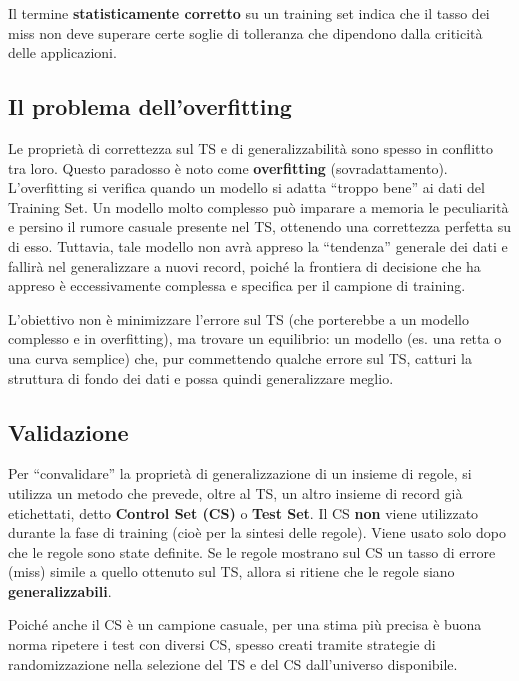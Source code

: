 \begin{nota}{}{}
Il termine \textbf{statisticamente corretto} su un training set indica che il
tasso dei miss non deve superare certe soglie di tolleranza che dipendono
dalla criticità delle applicazioni.
\end{nota}

\subsection{Il problema dell'overfitting}

Le proprietà di correttezza sul TS e di generalizzabilità sono
spesso in conflitto tra loro.
Questo paradosso è noto come \textbf{overfitting} (sovradattamento).
L'overfitting si verifica quando un modello si adatta
``troppo bene'' ai dati del Training Set. Un modello molto
complesso può imparare a memoria le peculiarità e persino
il rumore casuale presente nel TS, ottenendo una correttezza
perfetta su di esso.
Tuttavia, tale modello non avrà appreso la ``tendenza'' generale
dei dati e fallirà nel generalizzare a nuovi record,
poiché la frontiera di decisione che ha appreso è
eccessivamente complessa e specifica per il campione di training.

L'obiettivo non è minimizzare l'errore sul TS (che
porterebbe a un modello complesso e in overfitting), ma
trovare un equilibrio: un modello (es. una retta o una
curva semplice) che, pur commettendo qualche errore sul TS,
catturi la struttura di fondo dei dati e possa quindi
generalizzare meglio.

\subsection{Validazione}

Per ``convalidare'' la proprietà di generalizzazione di un
insieme di regole, si utilizza un metodo che prevede, oltre
al TS, un altro insieme di record già etichettati, detto
\textbf{Control Set (CS)} o \textbf{Test Set}.
Il CS \textbf{non} viene utilizzato durante la fase di
training (cioè per la sintesi delle regole). Viene usato
solo dopo che le regole sono state definite.
Se le regole mostrano sul CS un tasso di errore (miss)
simile a quello ottenuto sul TS, allora si ritiene
che le regole siano \textbf{generalizzabili}.

Poiché anche il CS è un campione casuale, per una stima
più precisa è buona norma ripetere i test con diversi CS,
spesso creati tramite strategie di randomizzazione
nella selezione del TS e del CS dall'universo disponibile.

